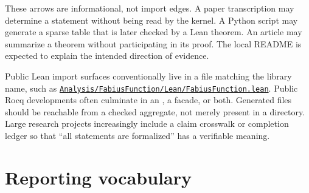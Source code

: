 \documentclass[
  10pt,
  a4paper,
  twoside,
  open=any,
  parskip=half,
  headings=big
]{scrreprt}
\newcommand{\CommitFull}{56a402bf82a9aab119fcbe3e96b991d387b221c5}
\newcommand{\RepoWeb}{https://github.com/VladimirReshetnikov/ProveIt}
\newcommand{\RepoBlobBase}{\RepoWeb/blob/\CommitFull}
\newcommand{\code}[1]{\texttt{\detokenize{#1}}}
\newcommand{\RepoFile}[1]{\href{\RepoBlobBase/#1}{\nolinkurl{#1}}}
\begin{document}
These arrows are informational, not import edges. A paper transcription may determine a statement without being read by the kernel. A Python script may generate a sparse table that is later checked by a Lean theorem. An article may summarize a theorem without participating in its proof. The local README is expected to explain the intended direction of evidence.

Public Lean import surfaces conventionally live in a file matching the library name, such as \RepoFile{Analysis/FabiusFunction/Lean/FabiusFunction.lean}. Public Rocq developments often culminate in an \code{Audit.v}, a facade, or both. Generated files should be reachable from a checked aggregate, not merely present in a directory. Large research projects increasingly include a claim crosswalk or completion ledger so that ``all statements are formalized'' has a verifiable meaning.

\section{Reporting vocabulary}
\end{document}
